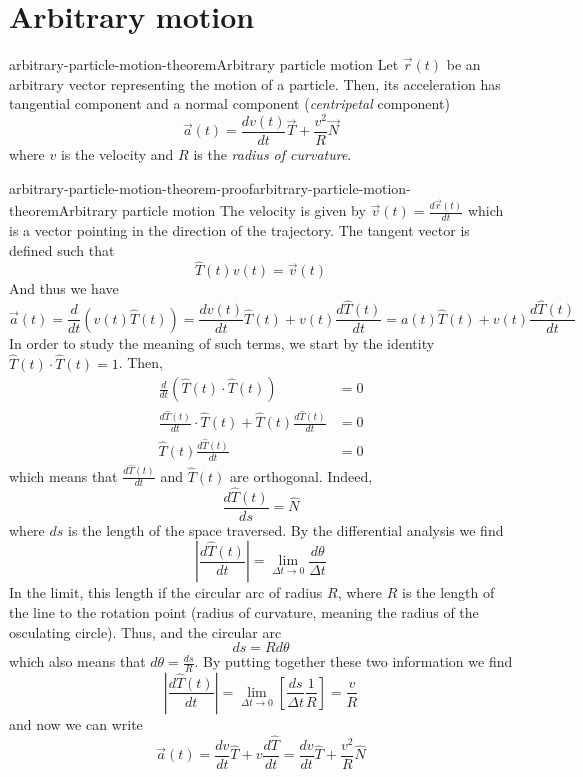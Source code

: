 \documentclass[preview]{standalone}
\begin{document}
\genpage

\section{Arbitrary motion}

\begin{snippettheorem}{arbitrary-particle-motion-theorem}{Arbitrary particle motion}
    Let \(\vec{r}(t)\) be an arbitrary vector representing the motion of a particle.
    Then, its acceleration has tangential component and a normal component (\emph{centripetal} component)
    \[
        \vec{a}(t) = \frac{dv(t)}{dt}\vec{T} + \frac{v^2}{R}\vec{N}
    \]
    where \(v\) is the velocity and \(R\) is the \emph{radius of curvature}.
\end{snippettheorem}

\begin{snippetproof}{arbitrary-particle-motion-theorem-proof}{arbitrary-particle-motion-theorem}{Arbitrary particle motion}
    The velocity is given by \(\vec{v}(t) = \frac{d\vec{r}(t)}{dt}\) which is a vector pointing in the direction of the trajectory.
    The tangent vector is defined such that
    \[
        \hat{T}(t) v(t) = \vec{v}(t)
    \]
    And thus we have
    \[
        \vec{a}(t) = \frac{d}{dt} \left(v(t)\hat{T}(t)\right) = \frac{dv(t)}{dt}\hat{T}(t) + v(t)\frac{d\hat{T}(t)}{dt} = a(t)\hat{T}(t) + v(t)\frac{d\hat{T}(t)}{dt}
    \]
    In order to study the meaning of such terms, we start by the identity \(\hat{T}(t) \cdot \hat{T}(t) = 1\).
    Then,
    \begin{align*}
        \frac{d}{dt} \left( \hat{T}(t) \cdot \hat{T}(t) \right) &= 0 \\
        \frac{d\hat{T}(t)}{dt} \cdot \hat{T}(t) + \hat{T}(t)\frac{d\hat{T}(t)}{dt} &= 0 \\
        \hat{T}(t)\frac{d\hat{T}(t)}{dt} &= 0 
    \end{align*}
    which means that \(\frac{d\hat{T}(t)}{dt}\) and \(\hat{T}(t)\) are orthogonal.
    Indeed,
    \[
        \frac{d\hat{T}(t)}{ds} = \hat{N}
    \]
    where \(ds\) is the length of the space traversed.
    By the differential analysis we find
    \[
        \left|\frac{d\hat{T}(t)}{dt}\right| = \lim_{\Delta t \to 0} \frac{d\theta}{\Delta t}
    \]
    In the limit,
    this length if the circular arc of radius \(R\), where \(R\) is the length of the line to the rotation point (radius of curvature, meaning the radius of the osculating circle).
    Thus,
    and the circular arc
    \[
        ds = Rd\theta
    \]
    which also means that \(d\theta = \frac{ds}{R}\).
    By putting together these two information we find
    \[
        \left|\frac{d\hat{T}(t)}{dt}\right| = \lim_{\Delta t \to 0} \left[\frac{ds}{\Delta t} \frac{1}{R}\right] = \frac{v}{R}
    \]
    and now we can write
    \[
        \vec{a}(t) = \frac{dv}{dt}\hat{T} + v\frac{d\hat{T}}{dt} = \frac{dv}{dt}\hat{T} + \frac{v^2}{R} \hat{N}
    \]
\end{snippetproof}
\end{document}
